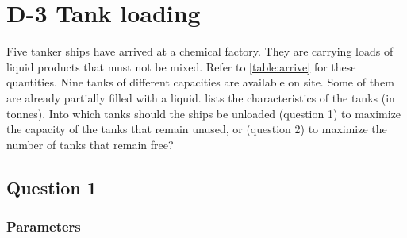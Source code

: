 \chapter{D-3 Tank loading}

Five tanker ships have arrived at a chemical factory. They are carrying loads
of liquid products that must not be mixed. Refer to \cref{table:arrive} for
these quantities. Nine tanks of different capacities are available on site.
Some of them are already partially filled with a liquid. 
lists the characteristics of the tanks (in tonnes). Into which tanks should
the ships be unloaded (question 1) to maximize the capacity of the tanks
that remain unused, or (question 2) to maximize the number of tanks that remain
free?

\section{Question 1}

\subsection{Parameters}


